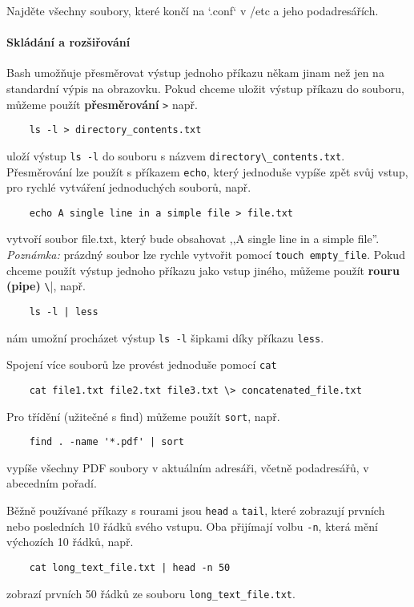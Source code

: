 \begin{exercise}
    Najděte všechny soubory, které končí na `.conf` v /etc a jeho podadresářích.
\end{exercise} 

\paragraph{Skládání a rozšiřování}

Bash umožňuje přesměrovat výstup jednoho příkazu někam jinam než jen na standardní výpis na obrazovku. Pokud chceme uložit výstup příkazu do souboru, můžeme použít
\textbf{přesměrování} \verb|>| např.
\begin{verbatim}
    ls -l > directory_contents.txt
\end{verbatim}
uloží výstup \verb|ls -l| do souboru s názvem \verb|directory\_contents.txt|. Přesměrování lze použít s příkazem \verb|echo|, který jednoduše vypíše zpět svůj vstup, pro rychlé vytváření
jednoduchých souborů, např.
\begin{verbatim}
    echo A single line in a simple file > file.txt
\end{verbatim}
vytvoří soubor file.txt, který bude obsahovat ,,A single line in a simple file''. \emph{Poznámka:} prázdný soubor lze rychle vytvořit pomocí \verb|touch empty_file|. Pokud chceme použít výstup jednoho příkazu jako vstup jiného, můžeme
použít \textbf{rouru (pipe)} \verb|\||, např.
\begin{verbatim}
    ls -l | less
\end{verbatim}
nám umožní procházet výstup \verb|ls -l| šipkami díky příkazu \verb|less|.

Spojení více souborů lze provést jednoduše pomocí \verb|cat|
\begin{verbatim}
    cat file1.txt file2.txt file3.txt \> concatenated_file.txt
\end{verbatim}

Pro třídění (užitečné s find) můžeme použít \verb|sort|, např.
\begin{verbatim}
    find . -name '*.pdf' | sort
\end{verbatim}
vypíše všechny PDF soubory v aktuálním adresáři, včetně podadresářů,
v abecedním pořadí.

Běžně používané příkazy s rourami jsou \verb|head| a \verb|tail|, které zobrazují prvních nebo posledních 10 řádků svého vstupu. Oba přijímají volbu \verb|-n|, která mění výchozích 10 řádků, např.
\begin{verbatim}
    cat long_text_file.txt | head -n 50
\end{verbatim}
zobrazí prvních 50 řádků ze souboru \verb|long_text_file.txt|.

